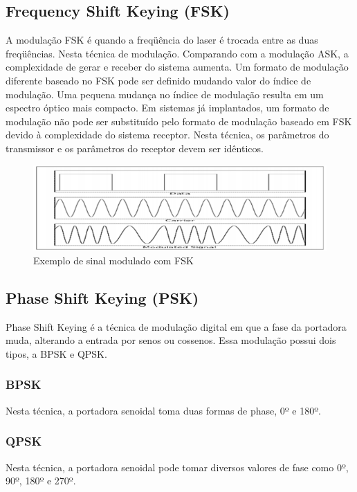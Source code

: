 \documentclass[article]{IEEEtran}
\begin{document}
\subsection{Frequency Shift Keying (FSK)}
\par A modulação FSK é quando a freqüência do laser é trocada entre as duas freqüências. Nesta técnica de modulação. Comparando com a modulação ASK, a complexidade de gerar e receber do sistema aumenta. Um formato de modulação diferente baseado no FSK pode ser definido mudando valor do índice de modulação. Uma pequena mudança no índice de modulação resulta em um espectro óptico mais compacto. Em sistemas já implantados, um formato de modulação não pode ser substituído pelo formato de modulação baseado em FSK devido à complexidade do sistema receptor. Nesta técnica, os parâmetros do transmissor e os  parâmetros do receptor devem ser idênticos.\cite{MODULATION}

\begin{figure}[hb]
\includegraphics[width=\columnwidth]{fsk.png}
\caption{Exemplo de sinal modulado com FSK}
\end{figure}

\subsection{Phase Shift Keying (PSK)}
\par Phase Shift Keying é a técnica de modulação digital em que a fase da portadora muda, alterando a entrada por senos ou cossenos. Essa modulação possui  dois tipos, a BPSK e QPSK.
\subsubsection{BPSK}
\par Nesta técnica, a portadora senoidal toma duas formas de phase, 0º e 180º.
\subsubsection{QPSK}
\par Nesta técnica, a portadora senoidal pode tomar diversos valores de fase como 0º, 90º, 180º e 270º.
\end{document}
